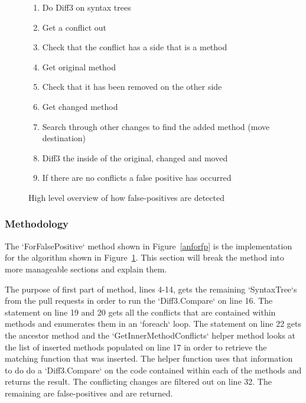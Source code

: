 \documentclass[draftclsnofoot,onecolumn]{IEEEtran}
\begin{document}
\begin{figure}[!t]
\centering
\begin{enumerate}
    \item Do Diff3 on syntax trees
    \item Get a conflict out
    \item Check that the conflict has a side that is a method
    \item Get original method
    \item Check that it has been removed on the other side
    \item Get changed method
    \item Search through other changes to find the added method (move 
destination)
    \item Diff3 the inside of the original, changed and moved
    \item If there are no conflicts a false positive has occurred
\end{enumerate}
\caption{High level overview of how false-positives are detected}
\label{fpalgore}
\end{figure}

\subsubsection{Methodology}

The `ForFalsePositive` method shown in Figure~\ref{anforfp} is the 
implementation for the algorithm shown in Figure~\ref{fpalgore}. This section 
will break the method into more manageable sections and explain them.

The purpose of first part of method, lines 4-14, gets the remaining 
`SyntaxTree`s from the pull requests in order to run the `Diff3.Compare` on 
line 16. The statement on line 19 and 20 gets all the conflicts that are 
contained within methods and enumerates them in an `foreach` loop. The 
statement on line 22 gets the ancestor method and the `GetInnerMethodConflicts` 
helper method looks at the list of inserted methods populated on line 17 in 
order to retrieve the matching function that was inserted. The helper function 
uses that information to do do a `Diff3.Compare` on the code contained within 
each of the methods and returns the result. The conflicting changes are 
filtered out on line 32. The remaining are false-positives and are returned.
\end{document}
